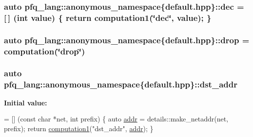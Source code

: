 \hypertarget{namespacepfq__lang_1_1anonymous__namespace_02default_8hpp_03_a6e71e558e459e950a4e9beeaaaf12cf6}{
\subsubsection[{dec}]{\setlength{\rightskip}{0pt plus 5cm}auto pfq\-\_\-lang\-::anonymous\-\_\-namespace\{default.\-hpp\}\-::dec = \mbox{[}$\,$\mbox{]} (int value) \{ return {\bf computation1}(\char`\"{}dec\char`\"{}, value); \}}}\label{namespacepfq__lang_1_1anonymous__namespace_02default_8hpp_03_a6e71e558e459e950a4e9beeaaaf12cf6}
\hypertarget{namespacepfq__lang_1_1anonymous__namespace_02default_8hpp_03_abed0412f2864624f755594077d255b1e}{
\subsubsection[{drop}]{\setlength{\rightskip}{0pt plus 5cm}auto pfq\-\_\-lang\-::anonymous\-\_\-namespace\{default.\-hpp\}\-::drop = {\bf computation}(\char`\"{}drop\char`\"{})}}\label{namespacepfq__lang_1_1anonymous__namespace_02default_8hpp_03_abed0412f2864624f755594077d255b1e}
\hypertarget{namespacepfq__lang_1_1anonymous__namespace_02default_8hpp_03_a4b72bac7c3af312ffe7c670eb2583f9a}{
\subsubsection[{dst\-\_\-addr}]{\setlength{\rightskip}{0pt plus 5cm}auto pfq\-\_\-lang\-::anonymous\-\_\-namespace\{default.\-hpp\}\-::dst\-\_\-addr}}\label{namespacepfq__lang_1_1anonymous__namespace_02default_8hpp_03_a4b72bac7c3af312ffe7c670eb2583f9a}
{\bfseries Initial value\-:}
\begin{DoxyCode}
= [] (\textcolor{keyword}{const} \textcolor{keywordtype}{char} *net, \textcolor{keywordtype}{int} prefix)
        \{
            \textcolor{keyword}{auto} \hyperlink{namespacepfq__lang_1_1anonymous__namespace_02default_8hpp_03_aafce8334d1be83bff9a2115439c8c453}{addr} = details::make\_netaddr(net, prefix);
            \textcolor{keywordflow}{return} \hyperlink{namespacepfq__lang_a58e7e358fc7c95121f74d56c094b1627}{computation1}(\textcolor{stringliteral}{"dst\_addr"}, \hyperlink{namespacepfq__lang_1_1anonymous__namespace_02default_8hpp_03_aafce8334d1be83bff9a2115439c8c453}{addr});
        \}
\end{DoxyCode}
